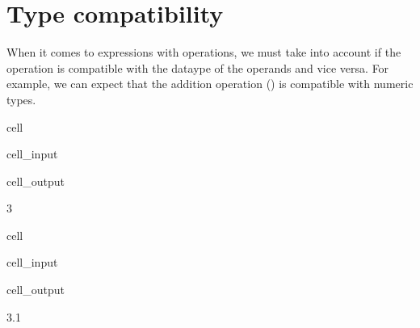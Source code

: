 \documentclass[letterpaper,10pt,english]{jupyterBook}
\begin{document}
\section{Type compatibility}
\label{\detokenize{datatypes:type-compatibility}}
\sphinxAtStartPar
When it comes to expressions with operations, we must take into account if the operation is compatible with the dataype of the operands and vice versa. For example, we can expect that the addition operation (\sphinxcode{\sphinxupquote{+}}) is compatible with numeric types.

\begin{sphinxuseclass}{cell}\begin{sphinxVerbatimInput}

\begin{sphinxuseclass}{cell_input}
\begin{sphinxVerbatim}[commandchars=\\\{\}]
  
\end{sphinxVerbatim}

\end{sphinxuseclass}\end{sphinxVerbatimInput}
\begin{sphinxVerbatimOutput}

\begin{sphinxuseclass}{cell_output}
\begin{sphinxVerbatim}[commandchars=\\\{\}]
3
\end{sphinxVerbatim}

\end{sphinxuseclass}\end{sphinxVerbatimOutput}

\end{sphinxuseclass}
\begin{sphinxuseclass}{cell}\begin{sphinxVerbatimInput}

\begin{sphinxuseclass}{cell_input}
\begin{sphinxVerbatim}[commandchars=\\\{\}]
  
\end{sphinxVerbatim}

\end{sphinxuseclass}\end{sphinxVerbatimInput}
\begin{sphinxVerbatimOutput}

\begin{sphinxuseclass}{cell_output}
\begin{sphinxVerbatim}[commandchars=\\\{\}]
3.1
\end{sphinxVerbatim}

\end{sphinxuseclass}\end{sphinxVerbatimOutput}

\end{sphinxuseclass}
\end{document}
